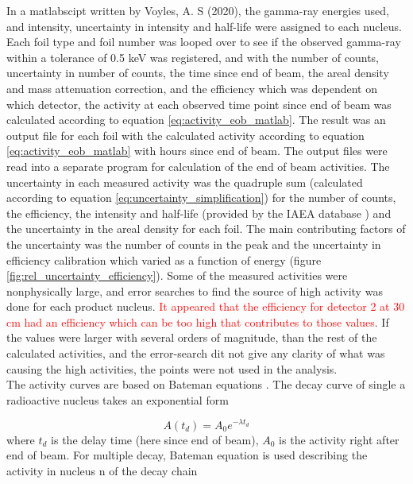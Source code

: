 In a matlabscipt written by Voyles, A. S (2020), the gamma-ray energies used, and intensity, uncertainty in intensity and half-life were assigned to each nucleus. Each foil type and foil number was looped over to see if the observed gamma-ray within a tolerance of 0.5 keV was registered, and with the number of counts, uncertainty in number of counts, the time since end of beam, the areal density and mass attenuation correction, and the efficiency which was dependent on which detector, the activity at each observed time point since end of beam was calculated according to equation \ref{eq:activity_eob_matlab}. The result was an output file for each foil with the calculated activity according to equation \ref{eq:activity_eob_matlab} with hours since end of beam. The output files were read into a separate program for calculation of the end of beam activities. The uncertainty in each measured activity was the quadruple sum (calculated according to equation \ref{eq:uncertainty_simplification}) for the number of counts, the efficiency, the intensity and half-life (provided by the IAEA database \cite{VRAPCENJAKLidijaZERKIN2015}) and the uncertainty in the areal density for each foil. The main contributing factors of the uncertainty was the number of counts in the peak and the uncertainty in efficiency calibration which varied as a function of energy (figure \ref{fig:rel_uncertainty_efficiency}). Some of the measured activities were nonphysically large, and error searches to find the source of high activity was done for each product nucleus. \textcolor{red}{It appeared that the efficiency for detector 2 at 30 cm had an efficiency which can be too high that contributes to those values}. If the values were larger with several orders of magnitude, than the rest of the calculated activities, and the error-search dit not give any clarity of what was causing the high activities, the points were not used in the analysis. \\ %


The activity curves are based on Bateman equations \cite{PopO.M.SimulikV.M.2016}. The decay curve of single a radioactive nucleus takes an exponential form

\begin{equation} \label{eq:singledecay}
    A(t_d)=A_0 e^{-\lambda t_d}
\end{equation} 
where $t_d$ is the delay time (here since end of beam), $A_0$ is the activity right after end of beam. For multiple decay, Bateman equation is used describing the activity in nucleus n of the decay chain

